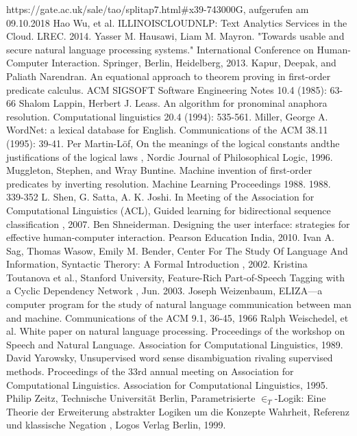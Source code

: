 \documentclass[12pt]{report}
\begin{document}
\begin{thebibliography}{20}
 https://gate.ac.uk/sale/tao/splitap7.html\#x39-743000G, aufgerufen am 09.10.2018
Hao Wu, et al. \glqq  ILLINOISCLOUDNLP: Text Analytics Services in the Cloud.\grqq{}  LREC. 2014.
 Yasser M. Hausawi, Liam M. Mayron. "Towards usable and secure natural language processing systems." International Conference on Human-Computer Interaction. Springer, Berlin, Heidelberg, 2013.
Kapur, Deepak, and Paliath Narendran. \glqq  An equational approach to theorem proving in first-order predicate calculus.\grqq{}  ACM SIGSOFT Software Engineering Notes 10.4 (1985): 63-66
 Shalom Lappin, Herbert J. Leass. \glqq  An algorithm for pronominal anaphora resolution.\grqq{}  Computational linguistics 20.4 (1994): 535-561.
Miller, George A. \glqq   WordNet: a lexical database for English.\grqq{}  Communications of the ACM 38.11 (1995): 39-41.
Per Martin-Löf, \glqq  On the meanings of the logical constants andthe justifications of the logical laws\grqq{} , Nordic Journal of Philosophical Logic, 1996.
Muggleton, Stephen, and Wray Buntine. \glqq  Machine invention of first-order predicates by inverting resolution.\grqq{}  Machine Learning Proceedings 1988. 1988. 339-352
 L. Shen, G. Satta, A. K. Joshi. In Meeting of the Association for Computational Linguistics (ACL), \glqq  Guided learning for bidirectional sequence classification\grqq{} , 2007.
Ben Shneiderman. Designing the user interface: strategies for effective human-computer interaction. Pearson Education India, 2010.
Ivan A. Sag, Thomas Wasow, Emily M. Bender, Center For The Study Of Language And Information, \glqq  Syntactic Therory: A Formal Introduction\grqq{} , 2002.
Kristina Toutanova et al., Stanford University, \glqq  Feature-Rich Part-of-Speech Tagging with a Cyclic Dependency Network\grqq{} , Jun. 2003.
Joseph Weizenbaum, \glqq  ELIZA—a computer program for the study of natural language communication between man and machine.\grqq{}  Communications of the ACM 9.1, 36-45, 1966
Ralph Weischedel, et al. \glqq  White paper on natural language processing.\grqq{}  Proceedings of the workshop on Speech and Natural Language. Association for Computational Linguistics, 1989.
David Yarowsky, \glqq  Unsupervised word sense disambiguation rivaling supervised methods.\grqq{}  Proceedings of the 33rd annual meeting on Association for Computational Linguistics. Association for Computational Linguistics, 1995.
Philip Zeitz, Technische Universität Berlin, \glqq  Parametrisierte $\in_T$-Logik: Eine Theorie der Erweiterung abstrakter Logiken um die Konzepte Wahrheit, Referenz und klassische Negation\grqq{} , Logos Verlag Berlin, 1999.
\end{thebibliography}
\end{document}
